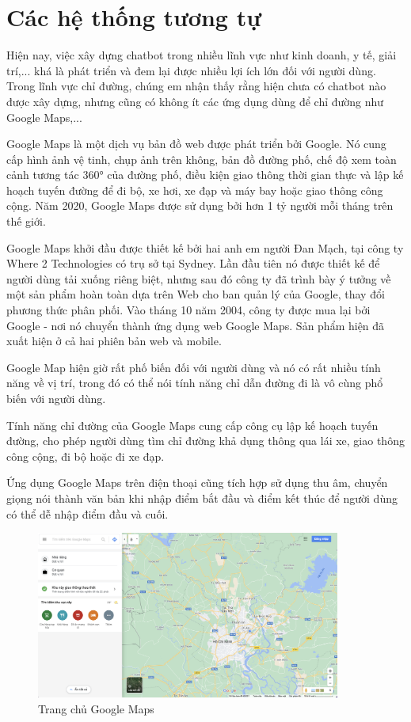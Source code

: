 \section{Các hệ thống tương tự}

Hiện nay, việc xây dựng chatbot trong nhiều lĩnh vực như kinh doanh, y tế, giải trí,... khá là phát triển và đem lại được nhiều lợi ích lớn đối với người dùng. Trong lĩnh vực chỉ đường, chúng em nhận thấy rằng hiện chưa có chatbot nào được xây dựng, nhưng cũng có không ít các ứng dụng dùng để chỉ đường như Google Maps\cite{ggmaps},...

Google Maps là một dịch vụ bản đồ web được phát triển bởi Google. Nó cung cấp hình ảnh vệ tinh, chụp ảnh trên không, bản đồ đường phố, chế độ xem toàn cảnh tương tác 360° của đường phố, điều kiện giao thông thời gian thực và lập kế hoạch tuyến đường để đi bộ, xe hơi, xe đạp và máy bay hoặc giao thông công cộng. Năm 2020, Google Maps được sử dụng bởi hơn 1 tỷ người mỗi tháng trên thế giới.

Google Maps khởi đầu được thiết kế bởi hai anh em người Đan Mạch, tại công ty Where 2 Technologies có trụ sở tại Sydney. Lần đầu tiên nó được thiết kế để người dùng tải xuống riêng biệt, nhưng sau đó công ty đã trình bày ý tưởng về một sản phẩm hoàn toàn dựa trên Web cho ban quản lý của Google, thay đổi phương thức phân phối. Vào tháng 10 năm 2004, công ty được mua lại bởi Google - nơi nó chuyển thành ứng dụng web Google Maps. Sản phẩm hiện đã xuất hiện ở cả hai phiên bản web và mobile.

Google Map hiện giờ rất phố biến đối với người dùng và nó có rất nhiều tính năng về vị trí, trong đó có thể nói tính năng chỉ dẫn đường đi là vô cùng phổ biến với người dùng.

Tính năng chỉ đường của Google Maps cung cấp công cụ lập kế hoạch tuyến đường, cho phép người dùng tìm chỉ đường khả dụng thông qua lái xe, giao thông công cộng, đi bộ hoặc đi xe đạp.

Ứng dụng Google Maps trên điện thoại cũng tích hợp sử dụng thu âm, chuyển giọng nói thành văn bản khi nhập điểm bắt đầu và điểm kết thúc để người dùng có thể dễ nhập điểm đầu và cuối.

\begin{figure}[H]
    \centering
    \includegraphics[width=10cm]{images/HomePage-GoogleMaps.png}
    \caption{Trang chủ Google Maps}
    \label{fig:homepage-ggmaps}
\end{figure}

